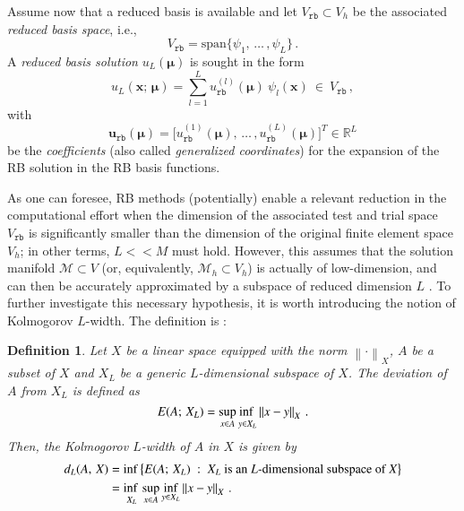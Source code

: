 \documentclass{elsarticle}
\theoremstyle{theorem}
\theoremstyle{definition}
\newtheorem{definition}{Definition}[section]
\theoremstyle{remark}
\theoremstyle{proposition}
\numberwithin{figure}{section}
\newcommand{\norm}[1]{\left\lVert#1\right\rVert}
\newcommand{\bg}[1]{\boldsymbol{#1}}
\begin{document}
		Assume now that a reduced basis is available and let $V_{\texttt{rb}} \subset V_h$ be the associated \emph{reduced basis space}, i.e.,
		\begin{equation*}
			V_{\texttt{rb}} = \text{span} \big\lbrace \psi_1, \, \ldots \, , \psi_L \big\rbrace \, .
		\end{equation*} 
		A \emph{reduced basis solution} $u_{L}(\bg{\mu})$ is sought in the form
		\begin{equation}
			\label{eq:rb-solution}
			u_{L}(\bg{x}; \, \bg{\mu}) = \sum_{l = 1}^L u_{\texttt{rb}}^{(l)}(\bg{\mu}) ~ \psi_l(\bg{x}) ~ \in ~ V_{\texttt{rb}} \, ,
		\end{equation}
		with \[ \mathbf{u}_{\texttt{rb}}(\bg{\mu}) = \big[ u_{\texttt{rb}}^{(1)}(\bg{\mu}), \, \ldots \, , u_{\texttt{rb}}^{(L)}(\bg{\mu}) \big]^T \in \mathbb{R}^L \] be the \emph{coefficients} (also called \emph{generalized coordinates}) for the expansion of the RB solution in the RB basis functions. 
		
		
		As one can foresee, RB methods (potentially) enable a relevant reduction in the computational effort when the dimension of the associated test and trial space $V_{\texttt{rb}}$ is significantly smaller than the dimension of the original finite element space $V_h$; in other terms, $L << M$ must hold. However, this assumes that the solution manifold $\mathcal{M} \subset V$ (or, equivalently, $\mathcal{M}_h \subset V_h$) is actually of low-dimension, and can then be accurately approximated by a subspace of reduced dimension $L$ \cite{HSR16}. To further investigate this necessary hypothesis, it is worth introducing the notion of Kolmogorov $L$-width. The definition is \cite{Mad06}:
		
		\begin{definition}
			\emph{
			Let $X$ be a linear space equipped with the norm $\norm{\cdot}_X$, $A$ be a subset of $X$ and $X_L$ be a generic $L$-dimensional subspace of $X$. The deviation of $A$ from $X_L$ is defined as
			\begin{equation*}
				E(A; \, X_L) = \adjustlimits \sup_{x \in A} \inf_{y \in X_L}  \norm{x - y}_X \, .
			\end{equation*}
			Then, the \emph{Kolmogorov $L$-width} of $A$ in $X$ is given by
			\begin{equation}
				\label{eq:kolmogorov-L-width}
				\begin{aligned}
					d_L(A, \, X) & = \inf \big\lbrace E(A; \, X_L) ~ : ~ \text{$X_L$ is an $L$-dimensional subspace of $X$} \big\rbrace \\
					& = \adjustlimits \inf_{X_L} \sup_{x \in A} \inf_{y \in X_L} \norm{x - y}_X \, .
				\end{aligned}
			\end{equation}
			}
		\end{definition}
		
\end{document}
